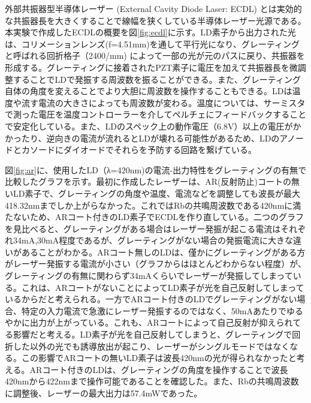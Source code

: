 \documentclass[dvipdfmx]{jsreport}
\begin{document}
外部共振器型半導体レーザー (External Cavity Diode Laser: ECDL) とは実効的な共振器長を大きくすることで線幅を狭くしている半導体レーザー光源である。\cite{suzuki}本実験で作成したECDLの概要を図\ref{fig:ecdl}に示す。LD素子から出力された光は、コリメーションレンズ(f=4.51mm)を通して平行光になり、グレーティングと呼ばれる回折格子（2400/mm) によって一部の光が元のパスに戻り、共振器を形成する。グレーティングに接着されたPZT素子に電圧を加えて共振器長を微調整することでLDで発振する周波数を振ることができる。また、グレーティング自体の角度を変えることでより大胆に周波数を操作することもできる。LDは温度や流す電流の大きさによっても周波数が変わる。温度については、サーミスタで測った電圧を温度コントローラーを介してペルチェにフィードバックすることで安定化している。また、LDのスペック上の動作電圧（6.8V）以上の電圧がかかったり、逆向きの電流が流れるとLDが壊れる可能性があるため、LDのアノードとカソードにダイオードでそれらを予防する回路を繋げている。
 
図\ref{fig:ar}に、使用したLD（λ=420nm)の電流-出力特性をグレーティングの有無で比較したグラフを示す。最初に作成したレーザーは、AR(反射防止)コートの無いLD素子で、グレーティングの角度や温度、電流などを調整しても波長が最大418.32nmまでしか上がらなかった。これではRbの共鳴周波数である420nmに満たないため、ARコート付きのLD素子でECDLを作り直している。二つのグラフを見比べると、グレーティングがある場合はレーザー発振が起こる電流はそれぞれ34mA,30mA程度であるが、グレーティングがない場合の発振電流に大きな違いがあることがわかる。ARコート無しのLDは、僅かにグレーティングがある方がレーザー発振する電流が小さい（グラフからはほとんどわからない程度）が、グレーティングの有無に関わらず34mAくらいでレーザーが発振してしまっている。これは、ARコートがないことによってLD素子が光を自己反射してしまっているからだと考えられる。一方でARコート付きのLDでグレーティングがない場合、特定の入力電流で急激にレーザー発振するのではなく、50mAあたりでゆるやかに出力が上がっている。これも、ARコートによって自己反射が抑えられてる影響だと考える。LD素子が光を自己反射してしまうと、グレーティングで回折した以外の光でも誘導放出が起こり、レーザーがシングルモードではなくなる。この影響でARコートの無いLD素子は波長420nmの光が得られなかったと考える。ARコート付きのLDは、グレーティングの角度を操作することで波長420nmから422nmまで操作可能であることを確認した。また、Rbの共鳴周波数に調整後、レーザーの最大出力は57.4mWであった。
\end{document}
